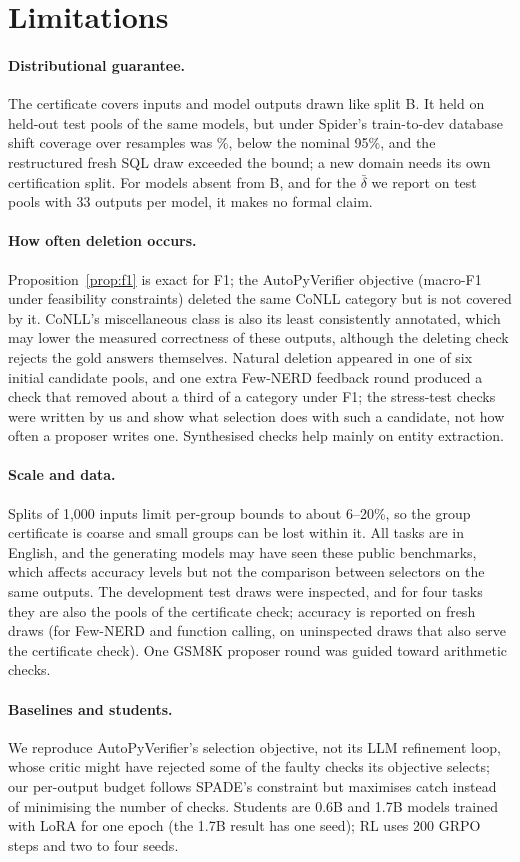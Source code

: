 \documentclass[11pt]{article}
\begin{document}
\section*{Limitations}
\paragraph{Distributional guarantee.} The certificate covers inputs and
model outputs drawn like split B. It held on held-out test pools of the
same models, but under Spider's train-to-dev database shift coverage over
resamples was \covCertSQL\%, below the nominal 95\%, and the restructured
fresh SQL draw exceeded the bound; a new domain needs its own certification split. For
models absent from B, and for the $\bar\delta$ we report on test pools with
33 outputs per model, it makes no formal claim.
\paragraph{How often deletion occurs.} Proposition~\ref{prop:f1} is exact
for F1; the AutoPyVerifier objective (macro-F1 under feasibility
constraints) deleted the same CoNLL category but is not covered by it.
CoNLL's miscellaneous class is also its least consistently annotated, which
may lower the measured correctness of these outputs, although the deleting
check rejects the gold answers themselves. Natural deletion appeared in one
of six initial candidate pools, and one
extra Few-NERD feedback round produced a check that removed about a third
of a category under F1; the stress-test checks were written by us and show
what selection does with such a candidate, not how often a proposer writes
one. Synthesised checks help mainly on entity extraction.
\paragraph{Scale and data.} Splits of 1{,}000 inputs limit per-group bounds
to about 6--20\%, so the group certificate is coarse and small groups can
be lost within it. All tasks are in English, and the generating models may
have seen these public benchmarks, which affects accuracy levels but not
the comparison between selectors on the same outputs. The development test
draws were inspected, and for four tasks they are also the pools of the
certificate check; accuracy is reported on fresh draws (for Few-NERD and
function calling, on uninspected draws that also serve the certificate
check). One GSM8K proposer round was guided toward arithmetic checks.
\paragraph{Baselines and students.} We reproduce AutoPyVerifier's selection
objective, not its LLM refinement loop, whose critic might have rejected
some of the faulty checks its objective selects; our per-output budget
follows SPADE's constraint but maximises catch instead of minimising the
number of checks. Students are 0.6B and 1.7B models trained with LoRA for
one epoch (the 1.7B result has one seed); RL uses 200 GRPO steps and two to
four seeds.
\end{document}
